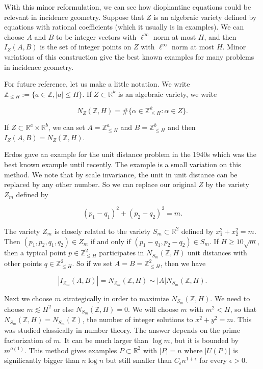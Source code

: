 \documentclass{amsart}
\newcommand{\eps}{\epsilon}
\newcommand{\ZZ}{\mathbb{Z}}
\newcommand{\RR}{\mathbb{R}}
\begin{document}
With this minor reformulation,  we can see how diophantine equations could be relevant in incidence geometry.   Suppose that $Z$ is an algebraic variety defined by equations with rational coefficients (which it usually is in examples).    We can choose $A$ and $B$ to be integer vectors with $\ell^\infty$ norm at most $H$,  and then $I_Z(A,B)$ is the set of integer points on $Z$ with $\ell^\infty$ norm at most $H$.   Minor variations of this construction give the best known examples for many problems in incidence geometry.

For future reference,  let us make a little notation.   We write $\ZZ_{\le H} := \{ a \in \ZZ,  |a| \le H \}$.   If $Z \subset \RR^k$ is an algebraic variety,  we write

$$ N_Z(\ZZ, H) = \# \{ \alpha \in \ZZ_{\le H}^k: \alpha \in Z \}. $$

\noindent If $Z \subset \RR^a \times \RR^b$, we can set $A = \ZZ_{\le H}^a$ and $B = \ZZ_{\le H}^b$ and then $I_Z(A,B) = N_Z(\ZZ, H)$.  

Erdos gave an example for the unit distance problem in the 1940s which was the best known example until recently.  The example is a small variation on this method.   We note that by scale invariance,  the unit in unit distance can be replaced by any other number.   So we can replace our original $Z$ by the variety $Z_m$ defined by

$$ (p_1 - q_1)^2 + (p_2 - q_2)^2 = m.  $$

\noindent The variety $Z_m$ is closely related to the variety $S_m \subset \RR^2$ defined by $x_1^2 + x_2^2 = m$.   Then $(p_1, p_2, q_1,q_2) \in Z_m$ if and only if $(p_1 - q_1, p_2 - q_2) \in S_m$.   If $H \ge 10 \sqrt m$,  then a typical point $p \in \ZZ_{\le H}^2$ participates in $N_{S_m}(\ZZ,  H)$ unit distances with other points $q \in \ZZ_{\le H}^2$.    So if we set $A = B = \ZZ_{\le H}^2$,  then we have

$$ | I_{Z_m}(A,B) | = N_{Z_m}(\ZZ,  H) \sim |A| N_{S_m}(\ZZ, H). $$

Next we choose $m$ strategically in order to maximize $N_{S_m}(\ZZ,  H)$.   We need to choose $m \lesssim H^2$ or else $N_{S_m}(\ZZ, H) = 0$.   We will choose $m$ with $m^2 < H$,  so that $N_{S_m}(\ZZ, H) = N_{S_m}(\ZZ)$,  the number of integer solutions to $x^2 + y^2 = m$.   This was studied classically in number theory.   The answer depends on the prime factorization of $m$.   It can be much larger than $\log m$,  but it is bounded by $m^{o(1)}$.   This method gives examples $P \subset \RR^2$ with $|P|=n$ where $|U(P)|$ is significantly bigger than $n \log n$ but still smaller than $C_\eps n^{1 + \epsilon}$ for every $\epsilon > 0$.
\end{document}
